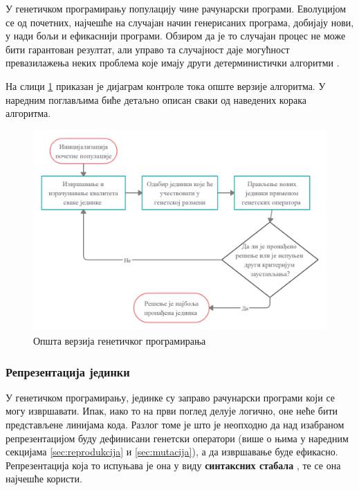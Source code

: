 \documentclass[a4paper]{article}
\begin{document}
У генетичком програмирању популацију чине рачунарски програми. Еволуцијом се од почетних, најчешће на случајан начин генерисаних програма, добијају нови, у нади бољи и ефикаснији програми. Обзиром да је то случајан процес не може бити гарантован резултат, али управо та случајност даје могућност превазилажења неких проблема које имају други детерминистички алгоритми \cite{fieldGuidetoGP}. 

На слици \ref{fig:kontrola_toka} приказан је дијаграм контроле тока опште верзије алгоритма. У наредним поглављима биће детаљно описан сваки од наведених корака алгоритма.

\begin{figure}[h!]
    \begin{center}
        \includegraphics[scale=0.22]{opstiAlgoritam.png}
    \end{center}
    \caption{Општа верзија генетичког програмирања}
    \label{fig:kontrola_toka}
\end{figure}

\subsubsection{Репрезентација јединки}

У генетичком програмирању, јединке су заправо рачунарски програми који се могу извршавати. Ипак, иако то на први поглед делује логично, оне неће бити представљене линијама кода. Разлог томе је што је неопходно да над изабраном репрезентацијом буду дефинисани генетски оператори (више о њима у наредним секцијама \ref{sec:reprodukcija} и \ref{sec:mutacija}), а да извршавање буде ефикасно. Репрезентација која то испуњава је она у виду \textbf{синтаксних стабала} \cite{synTrees}, те се она најчешће користи.\newline
\end{document}
